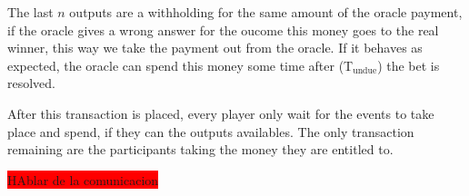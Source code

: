The last $n$ outputs are a withholding for the same amount of the oracle
  payment, if the oracle gives a wrong answer for the oucome this money
  goes to the real winner, this way we take the payment out from the oracle.
If it behaves as expected, the oracle can spend this money some time after
  (T$_{\text{undue}}$) the bet is resolved.

After this transaction is placed, every player only wait for the events to take
  place and spend, if they can the outputs availables. The only transaction
  remaining are the participants taking the money they are entitled to.

\colorbox{red}{HAblar de la comunicacion}

